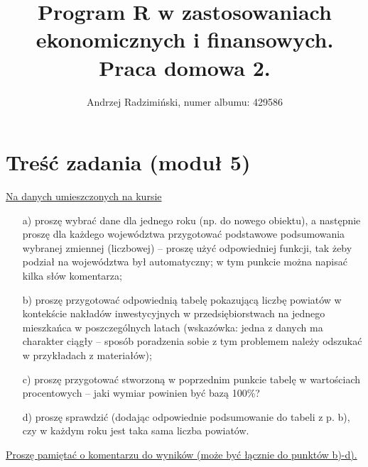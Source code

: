 

\title{Program R w zastosowaniach ekonomicznych i finansowych. Praca domowa 2.}
\author{Andrzej Radzimiński, numer albumu: 429586}
\date{}



\renewcommand{\contentsname}{Spis treści}

\setlength{\parindent}{0pt}
\noindent

\maketitle



\section*{Treść zadania (moduł 5)}

\underline{Na danych umieszczonych na kursie}

\begin{itemize}
    \item[a)] proszę wybrać dane dla jednego roku (np. do nowego obiektu), a następnie proszę dla
    każdego województwa przygotować podstawowe podsumowania wybranej zmiennej
    (liczbowej) -- proszę użyć odpowiedniej funkcji, tak żeby podział na województwa był
    automatyczny; w tym punkcie można napisać kilka słów komentarza;

    
    \item[b)] proszę przygotować odpowiednią tabelę pokazującą liczbę powiatów w kontekście
    nakładów inwestycyjnych w przedsiębiorstwach na jednego mieszkańca w
    poszczególnych latach (wskazówka: jedna z danych ma charakter ciągły -- sposób
    poradzenia sobie z tym problemem należy odszukać w przykładach z materiałów);

    \item[c)] proszę przygotować stworzoną w poprzednim punkcie tabelę w wartościach
    procentowych -- jaki wymiar powinien być bazą 100\%?

    \item[d)] proszę sprawdzić (dodając odpowiednie podsumowanie do tabeli z p. b), czy w każdym
    roku jest taka sama liczba powiatów.
\end{itemize}

\underline{Proszę pamiętać o komentarzu do wyników (może być łącznie do punktów b)-d).}


